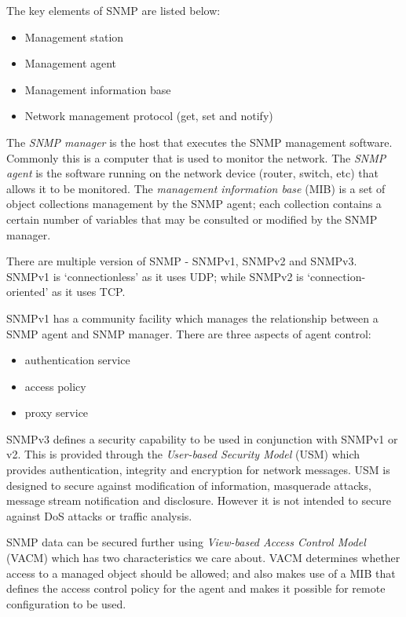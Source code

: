 The key elements of SNMP are listed below:
\begin{itemize}
    \item Management station
    \item Management agent
    \item Management information base
    \item Network management protocol (get, set and notify)
\end{itemize}

The \textit{SNMP manager} is the host that executes the SNMP management software. Commonly this is a computer that is used to monitor the network. The \textit{SNMP agent} is the software running on the network device (router, switch, etc) that allows it to be monitored. The \textit{management information base} (MIB) is a set of object collections management by the SNMP agent; each collection contains a certain number of variables that may be consulted or modified by the SNMP manager. 

There are multiple version of SNMP - SNMPv1, SNMPv2 and SNMPv3. SNMPv1 is `connectionless' as it uses UDP; while SNMPv2 is `connection-oriented' as it uses TCP.

SNMPv1 has a community facility which manages the relationship between a SNMP agent and SNMP manager. There are three aspects of agent control:
\begin{itemize}
    \item authentication service
    \item access policy
    \item proxy service
\end{itemize}

SNMPv3 defines a security capability to be used in conjunction with SNMPv1 or v2. This is provided through the \textit{User-based Security Model} (USM) which provides authentication, integrity and encryption for network messages. USM is designed to secure against modification of information, masquerade attacks, message stream notification and disclosure. However it is not intended to secure against DoS attacks or traffic analysis.

SNMP data can be secured further using \textit{View-based Access Control Model} (VACM) which has two characteristics we care about. VACM determines whether access to a managed object should be allowed; and also makes use of a MIB that defines the access control policy for the agent and makes it possible for remote configuration to be used. 
